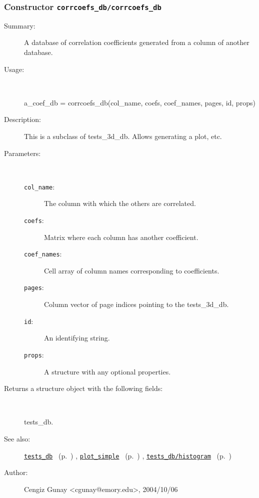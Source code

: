 \subsubsection[Constructor \texttt{corrcoefs\_db}]{Constructor \texttt{corrcoefs\_db/corrcoefs\_db}}%
%
\label{ref_corrcoefs_db__corrcoefs_db}%
\hypertarget{ref_corrcoefs_db__corrcoefs_db}{}%
\begin{description}
\item[Summary:]A database of correlation coefficients generated from 
		a column of another database.
%
\item[Usage:]~%
\begin{lyxcode}%
a\_coef\_db = corrcoefs\_db(col\_name, coefs, coef\_names, pages, id, props)
%
\end{lyxcode}%
%
\item[Description:]%
This is a subclass of tests\_3d\_db. Allows generating a plot, etc.
\item[Parameters:]~
\begin{description}%
\item[\texttt{col\_name}:]
 The column with which the others are correlated.
\item[\texttt{coefs}:]
 Matrix where each column has another coefficient.
\item[\texttt{coef\_names}:]
 Cell array of column names corresponding to coefficients.
\item[\texttt{pages}:]
 Column vector of page indices pointing to the tests\_3d\_db.
\item[\texttt{id}:]
 An identifying string.
\item[\texttt{props}:]
 A structure with any optional properties.
\end{description}%
%
\item[Returns a structure object with the following fields:]~

	tests\_db.
%
%
\item[See also:]%
\hyperlink{ref_tests_db}{\texttt{tests\_db}}%
\ (p.~\pageref{ref_tests_db})%
%
, \hyperlink{ref_plot_simple}{\texttt{plot\_simple}}%
\ (p.~\pageref{ref_plot_simple})%
%
, \hyperlink{ref_tests_db__histogram}{\texttt{tests\_db/histogram}}%
\ (p.~\pageref{ref_tests_db__histogram})%
%
%
\item[Author:]%
Cengiz Gunay <cgunay@emory.edu>, 2004/10/06%
\end{description}
\methodline%
